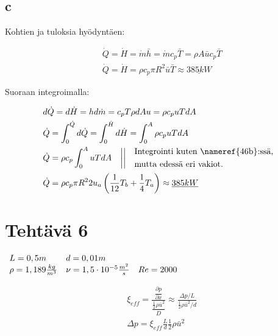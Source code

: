 \documentclass[12pt,a4paper,finnish]{article}
\begin{document}
\subsection{c}

Kohtien  ja  tuloksia hyödyntäen:

\begin{align}
 &\dot{Q} = \dot{H} = \dot{m}\bar{h} = \dot{m}c_p\bar{T} = \rho A\bar{u}c_p\bar{T}\\
 &\dot{Q} = \dot{H} = \rho c_p\pi R^2\bar{u}\bar{T} \approx \underline{385kW}
\end{align}

Suoraan integroimalla:

\begin{align}
 &d\dot{Q} = d\dot{H} = hd\dot{m} = c_pT\rho dAu = \rho c_p uTdA\\
 &\dot{Q} = \int_0^{\dot{Q}}d\dot{Q} = \int_0^{\dot{H}}d\dot{H} 
  = \int_0^A\rho c_p uTdA\\
 &\dot{Q} = \rho c_p\int_0^A uTdA \quad \bigg|\bigg| \quad 
  \begin{aligned}
   &\text{Integrointi kuten \nameref{46b}:ssä,}\\&\text{mutta edessä eri vakiot.}
  \end{aligned}\\
 &\dot{Q} = \rho c_p \pi R^2 2u_a\left(\frac{1}{12}T_b + \frac{1}{4}T_a\right)
   \approx \underline{385kW}
\end{align}

\section{Tehtävä 6}

\begin{math}
 \begin{array}{l l l}
  L = 0,5m & d = 0,01m & \\
  \rho = 1,189 \frac{kg}{m^3} & \nu = 1,5\cdot 10^{-5}\frac{m^2}{s} & Re = 2000
 \end{array}
\end{math}

\begin{align}
 &\xi_{eff} = \frac{\dfrac{\partial p}{\partial x}}{\dfrac{\frac{1}{2}\rho \bar{u}^2}{D}}
  \approx \frac{\Delta p/L}{\frac{1}{2}\rho \bar{u}^2/d}\\
 &\Delta p = \xi_{eff}\frac{L}{d}\frac{1}{2}\rho \bar{u}^2
\end{align}
\end{document}

